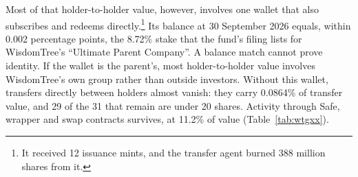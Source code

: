 \documentclass[12pt,a4paper]{article}
\begin{document}
Most of that holder-to-holder value, however, involves one wallet that also subscribes and redeems directly.\footnote{It received 12 issuance mints, and the transfer agent burned 388 million shares from it.} Its balance at 30 September 2026 equals, within 0.002 percentage points, the 8.72\% stake that the fund's filing lists for WisdomTree's ``Ultimate Parent Company''. A balance match cannot prove identity. If the wallet is the parent's, most holder-to-holder value involves WisdomTree's own group rather than outside investors. Without this wallet, transfers directly between holders almost vanish: they carry 0.0864\% of transfer value, and 29 of the 31 that remain are under 20 shares. Activity through Safe, wrapper and swap contracts survives, at 11.2\% of value (Table~\ref{tab:wtgxx}).
\end{document}
